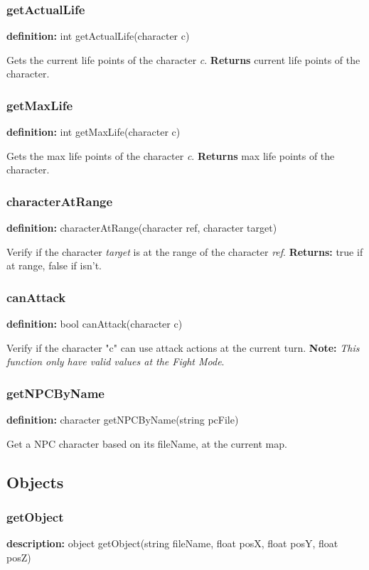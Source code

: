 \documentclass[ letterpaper,12pt]{article}
\begin{document}
\subsubsection{getActualLife}
{\bf definition:} int getActualLife(character c)

Gets the current life points of the character {\it c}. {\bf Returns} current
life points of the character.

\subsubsection{getMaxLife}
{\bf definition:} int getMaxLife(character c)

Gets the max life points of the character {\it c}. {\bf Returns} max
life points of the character.

\subsubsection{characterAtRange}
{\bf definition:} characterAtRange(character ref, character target)

Verify if the character {\it target} is at the range of the character {\it ref}.
{\bf Returns:} true if at range, false if isn't.

\subsubsection{canAttack}
{\bf definition:} bool canAttack(character c)

Verify if the character "c" can use attack actions at the current turn.
{\bf Note:} {\it This function only have valid values at the Fight Mode}.

\subsubsection{getNPCByName}
{\bf definition:} character getNPCByName(string pcFile)

Get a NPC character based on its fileName, at the current map.

\subsection{Objects}

\subsubsection{getObject}
{\bf description:} object getObject(string fileName, float posX, float posY,
float posZ)
\end{document}

